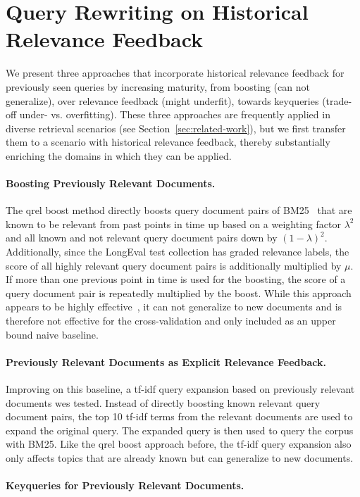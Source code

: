 \section{Query Rewriting on Historical Relevance Feedback}

We present three approaches that incorporate historical relevance feedback for previously seen queries by increasing maturity, from \Ni boosting (can not generalize), over \Nii relevance feedback (might underfit), towards \Niii keyqueries (trade-off under- vs. overfitting). These three approaches are frequently applied in diverse retrieval scenarios (see Section~\ref{sec:related-work}), but we first transfer them to a scenario with historical relevance feedback, thereby substantially enriching the domains in which they can be applied.

\paragraph{Boosting Previously Relevant Documents.} The qrel boost method directly boosts query document pairs of BM25~\cite{robertson:1994} that are known to be relevant from past points in time up based on a weighting factor $\lambda^2$ and all known and not relevant query document pairs down by $(1-\lambda)^2$. Additionally, since the LongEval test collection has graded relevance labels, the score of all highly relevant query document pairs is additionally multiplied by $\mu$. If more than one previous point in time is used for the boosting, the score of a query document pair is repeatedly multiplied by the boost. While this approach appears to be highly effective~\cite{alkhalifa:2024,keller:2024b}, it can not generalize to new documents and is therefore not effective for the cross-validation and only included as an upper bound naive baseline.


\paragraph{Previously Relevant Documents as Explicit Relevance Feedback.} Improving on this baseline, a tf-idf query expansion based on previously relevant documents wes tested. Instead of directly boosting known relevant query document pairs, the top 10 tf-idf terms from the relevant documents are used to expand the original query. The expanded query is then used to query the corpus with BM25. Like the qrel boost approach before, the tf-idf query expansion also only affects topics that are already known but can generalize to new documents.


\paragraph{Keyqueries for Previously Relevant Documents.}

